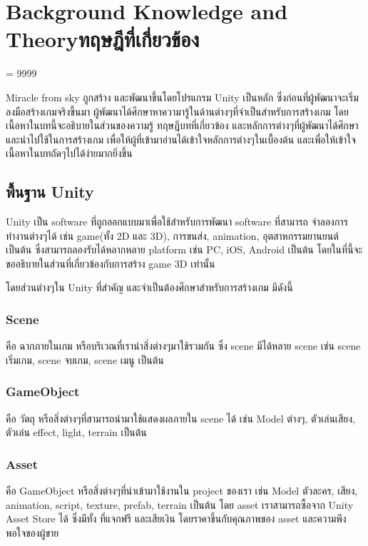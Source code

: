 \chapter{\ifenglish Background Knowledge and Theory\else ทฤษฎีที่เกี่ยวข้อง\fi}
\tolerance = 9999
\overfullrule=0pt

\enskip \enskip \enskip \enskip \enskip Miracle from sky ถูกสร้าง และพัฒนาขึ้นโดยโปรแกรม Unity เป็นหลัก
 ซึ่งก่อนที่ผู้พัฒนาจะเริ่มลงมือสร้างเกมจริงขึ้นมา ผู้พัฒนาได้ศึกษาหาความารู้ในด้านต่างๆที่จำเป็นสำหรับการสร้างเกม  
โดยเนื้อหาในบทนี้จะอธิบายในส่วนของความรู้ ทฤษฎีบทที่เกี่ยวข้อง และหลักการต่างๆที่ผู้พัฒนาได้ศึกษา และนำไปใช้ในการสร้างเกม 
เพื่อให้ผู้ที่เข้ามาอ่านได้เข้าใจหลักการต่างๆในเบื้องต้น และเพื่อให้เข้าใจเนื้อหาในบทถัดๆไปได้ง่ายมากยิ่งขึ้น

\section{พื้นฐาน Unity}
\enskip \enskip \enskip \enskip \enskip Unity เป็น software ที่ถูกออกแบบมาเพื่อใช้สำหรับการพัฒนา software ที่สามารถ
จำลองการทำงานต่างๆได้ เช่น game(ทั้ง 2D และ 3D), การขนส่ง, animation, อุตสาหกรรมยานยนต์ เป็นต้น 
ซึ่งสามารถลองรับได้หลากหลาย platform เช่น PC, iOS, Android เป็นต้น โดยในที่นี้จะขออธิบายในส่วนที่เกี่ยวข้องกับการสร้าง
game 3D เท่านั้น

\enskip \enskip โดยส่วนต่างๆใน Unity ที่สำคัญ และจำเป็นต้องศึกษาสำหรับการสร้างเกม มีดังนี้
\subsection{Scene}
คือ ฉากภายในเกม หรือบริเวณที่เรานำสิ่งต่างๆมาใช้รวมกัน ซึ่ง scene มีได้หลาย scene เช่น scene เริ่มเกม,
 scene จบเกม, scene เมนู เป็นต้น
\subsection{GameObject}
คือ วัตถุ หรือสิ่งต่างๆที่สามารถนำมาใช้แสดงผลภายใน scene ได้ เช่น Model ต่างๆ, ตัวเล่นเสียง,
ตัวเล่น effect, light, terrain เป็นต้น
\subsection{Asset}
คือ GameObject หรือสิ่งต่างๆที่นำเข้ามาใช้งานใน project ของเรา เช่น Model ตัวละคร, เสียง, animation,
script, texture, prefab, terrain เป็นต้น โดย asset เราสามารถซื้อจาก Unity Asset Store ได้ ซึ่งมีทั้ง
ที่แจกฟรี และเสียเงิน โดยราคาขึ้นกับคุณภาพของ asset และความพึงพอใจของผู้ขาย
